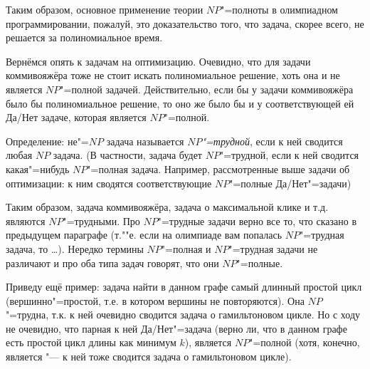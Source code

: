 \documentclass[a4paper,10pt]{problems}
\begin{document}

Таким образом, основное применение теории $NP$"=полноты в олимпиадном программировании, пожалуй, это доказательство того, что 
задача, скорее всего, не решается за полиномиальное время.

 Вернёмся опять к задачам на оптимизацию. 
Очевидно, что для задачи
коммивояжёра тоже не стоит искать полиномиальное решение, хоть она и не является $NP$"=полной 
задачей. Действительно, если бы у задачи коммивояжёра было бы полиномиальное решение, то оно 
же было бы и у соответствующей ей Да/Нет задаче, которая является $NP$"=полной.

Определение: не"=$NP$ задача называется \textit{$NP$"=трудной}, если к 
ней сводится любая $NP$ задача. (В частности, задача будет $NP$"=трудной, если 
к ней сводится какая"=нибудь $NP$"=полная задача. Например, рассмотренные выше 
задачи об оптимизации: к ним сводятся соответствующие $NP$"=полные Да/Нет"=задачи)

Таким образом, задача коммивояжёра, задача о максимальной клике и т.д. являются $NP$"=трудными. Про 
$NP$"=трудные задачи верно все то, что сказано в предыдущем параграфе (т.""е. если на 
олимпиаде вам попалась $NP$"=трудная задача, то \dots). Нередко термины $NP$"=полная и 
$NP$"=трудная задачи не различают и про оба типа задач говорят, что они $NP$"=полные.

Приведу ещё пример: задача найти в данном графе самый длинный простой цикл 
(вершинно"=простой, т.е. в котором вершины не повторяются). Она $NP$"=трудна, 
т.к. к ней очевидно сводится задача о гамильтоновом цикле. Но с ходу не 
очевидно, что парная к ней Да/Нет"=задача (верно ли, что в данном графе есть 
простой цикл длины как минимум $k$), является $NP$"=полной (хотя, конечно, является "--- к ней тоже сводится задача о гамильтоновом цикле).

\end{document}

